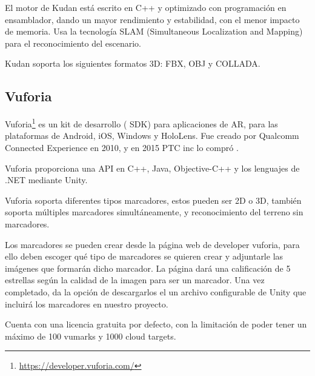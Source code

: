 El motor de Kudan está escrito en C++ y optimizado con programación en ensamblador, dando un mayor rendimiento y estabilidad, con el menor impacto de memoria.
Usa la tecnología SLAM (Simultaneous Localization and Mapping) para el reconocimiento del escenario.


Kudan soporta los siguientes formatos 3D: FBX, OBJ y COLLADA.

\subsection{Vuforia}
Vuforia\footnote{\url{https://developer.vuforia.com/}} es un kit de desarrollo ( SDK) para aplicaciones de AR, para las plataformas de Android, iOS, Windows y HoloLens. Fue creado por Qualcomm Connected Experience en 2010, y en 2015 PTC inc lo compró \cite{simonetti2013vuforia}.

Vuforia proporciona una API en C++, Java, Objective-C++ y los lenguajes de .NET mediante Unity.

Vuforia soporta diferentes tipos marcadores, estos pueden ser 2D o 3D, también soporta múltiples marcadores simultáneamente, y reconocimiento del terreno sin marcadores.

Los marcadores se pueden crear desde la página web de developer vuforia, para ello deben escoger qué tipo de marcadores se quieren crear y adjuntarle las imágenes que formarán dicho marcador. La página dará una calificación de 5 estrellas según la calidad de la imagen para ser un marcador. Una vez completado, da la opción de descargarlos el un archivo configurable de Unity que incluirá los marcadores en nuestro proyecto.



Cuenta con una licencia gratuita por defecto, con la limitación de poder tener un máximo de 100 vumarks y 1000 cloud targets.


